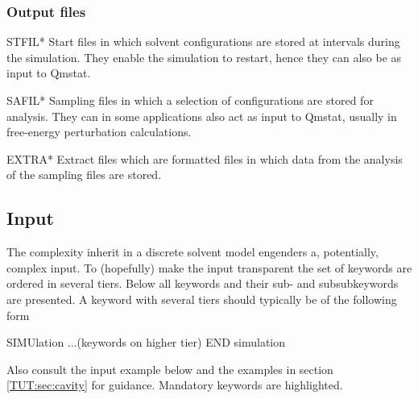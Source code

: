 \subsubsection{Output files}
\begin{filelist}
\item[STFIL*]
Start files in which solvent configurations are stored at intervals during
the simulation. They enable the simulation to restart, hence they can
also be as input to {\prgmfont Qmstat}.
\item[SAFIL*]
Sampling files in which a selection of configurations are stored for
analysis. They can in some applications also act as input to {\prgmfont Qmstat},
usually in free-energy perturbation calculations.
\item[EXTRA*]
Extract files which are formatted files in which data from the analysis
of the sampling files are stored.
\end{filelist}

\subsection{Input}
\label{UG:sec:qmstat_input}

The complexity inherit in a discrete solvent model engenders a,
potentially, complex input. To (hopefully) make the input transparent
the set of keywords are ordered in several tiers. Below all keywords and
their sub- and subsubkeywords are presented.
A keyword with several tiers should typically be of the
following form
\begin{inputlisting}
SIMUlation
...(keywords on higher tier)
END simulation
\end{inputlisting}
Also consult the input example below and the examples in section
\ref{TUT:sec:cavity} for guidance. Mandatory keywords
are highlighted.

